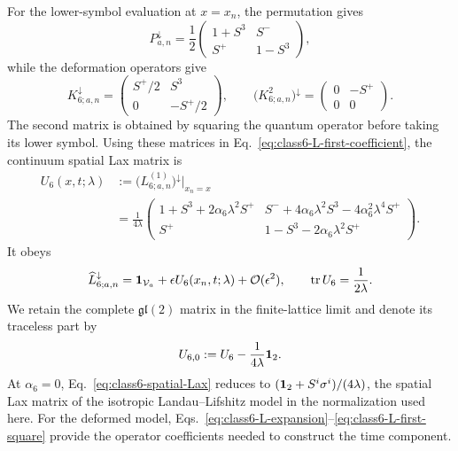 For the lower-symbol evaluation at $x=x_n$, the permutation gives
\begin{equation}
P_{a,n}^{\downarrow}
=\frac12
\begin{pmatrix}
1+S^3&S^-\\
S^+&1-S^3
\end{pmatrix},
\label{eq:class6-P-lower-symbol}
\end{equation}
while the deformation operators give
\begin{equation}
K_{6;a,n}^{\downarrow}
=\begin{pmatrix}
S^+/2&S^3\\
0&-S^+/2
\end{pmatrix},
\qquad
\bigl(K_{6;a,n}^2\bigr)^{\downarrow}
=\begin{pmatrix}
0&-S^+\\
0&0
\end{pmatrix}.
\label{eq:class6-K-lower-symbols}
\end{equation}
The second matrix is obtained by squaring the quantum operator before
taking its lower symbol.  Using these matrices in
Eq.~\eqref{eq:class6-L-first-coefficient}, the continuum spatial Lax
matrix is
\begin{align}
U_6(x,t;\lambda)
&:=\bigl(L^{(1)}_{6;a,n}\bigr)^{\downarrow}
\big|_{x_n=x}
\nonumber\\
&=\frac{1}{4\lambda}
\begin{pmatrix}
1+S^3+2\alpha_6\lambda^2S^+
&S^-+4\alpha_6\lambda^2S^3-4\alpha_6^2\lambda^4S^+\\
S^+&1-S^3-2\alpha_6\lambda^2S^+
\end{pmatrix}.
\label{eq:class6-spatial-Lax}
\end{align}
It obeys
\begin{equation}
\widehat L_{6;a,n}^{\downarrow}
=\mathbf{1}_{\mathcal V_a}+\epsilon U_6(x_n,t;\lambda)
+\mathcal O(\epsilon^2),
\qquad
\operatorname{tr} U_6=\frac{1}{2\lambda}.
\label{eq:class6-L-lower-expansion}
\end{equation}
We retain the complete $\mathfrak{gl}(2)$ matrix in the finite-lattice
limit and denote its traceless part by
\begin{equation}
U_{6,0}:=U_6-\frac{1}{4\lambda}\mathbf{1}_2.
\label{eq:class6-traceless-U}
\end{equation}
At $\alpha_6=0$, Eq.~\eqref{eq:class6-spatial-Lax} reduces to
$(\mathbf{1}_2+S^i\sigma^i)/(4\lambda)$, the spatial Lax matrix of the isotropic
Landau--Lifshitz model in the normalization used here.  For the deformed
model, Eqs.~\eqref{eq:class6-L-expansion}--\eqref{eq:class6-L-first-square}
provide the operator coefficients needed to construct the time component.




